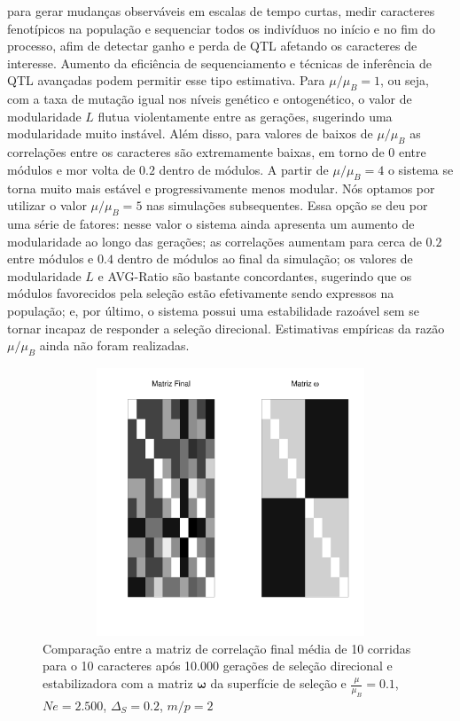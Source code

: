 para gerar mudanças observáveis em escalas de tempo curtas, medir
caracteres fenotípicos na população e sequenciar todos os indivíduos no
início e no fim do processo, afim de detectar ganho e perda de QTL
afetando os caracteres de interesse.
Aumento da eficiência de sequenciamento e técnicas de inferência de QTL
avançadas podem permitir esse tipo estimativa.
Para $\mu/\mu_B=1$, ou seja, com a taxa de mutação igual nos níveis
genético e ontogenético, o valor de modularidade $L$ flutua violentamente entre
as gerações, sugerindo uma modularidade muito instável. 
Além disso, para valores de baixos de $\mu/\mu_B$ as correlações entre
os caracteres são extremamente baixas, em torno de $0$ entre módulos e
mor volta de $0.2$ dentro de módulos.
A partir de $\mu/\mu_B=4$ o sistema se torna muito mais estável e
progressivamente menos modular. 
Nós optamos por utilizar o valor $\mu/\mu_B=5$ nas simulações
subsequentes. 
Essa opção se deu por uma série de fatores: nesse valor o sistema ainda
apresenta um aumento de modularidade ao longo das gerações; as
correlações aumentam para cerca de $0.2$ entre módulos e $0.4$ dentro de
módulos ao final da simulação; os valores de modularidade $L$ e
AVG-Ratio são bastante concordantes, sugerindo que os módulos
favorecidos pela seleção estão efetivamente sendo expressos na
população; e, por último, o sistema possui uma estabilidade razoável sem
se tornar incapaz de responder a seleção direcional. 
Estimativas empíricas da razão $\mu/\mu_B$ ainda não foram realizadas.



\begin{figure}[htbp]
    \centering
    \includegraphics[width=150mm, height=80mm]{figuras/RMu01Omega}
    \caption{Comparação entre a matriz de correlação final média de 10
        corridas para o 10 caracteres após 10.000 gerações de seleção direcional e
        estabilizadora com a matriz $\pmb{\omega}$ da superfície de seleção e
    $\frac{\mu}{\mu_B}=0.1$, $Ne=2.500$, $\Delta_S=0.2$, $m/p=2$}
    \label{RMu01}
\end{figure}


